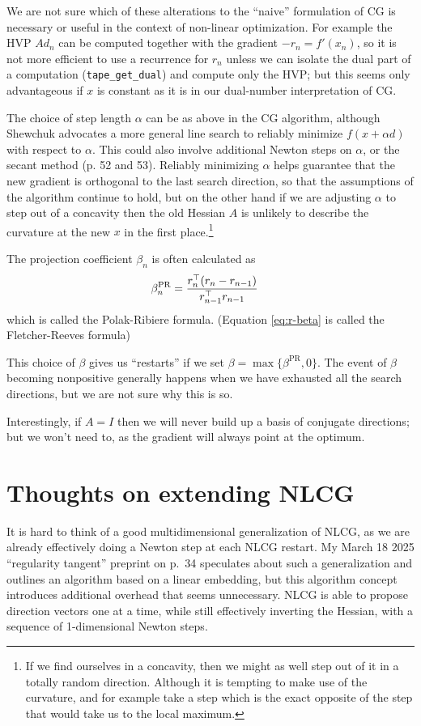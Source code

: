 \documentclass[11pt]{article}
\newcommand{\T}{\top}
\renewcommand{\(}{\left(}
\renewcommand{\)}{\right)}
\newcommand{\betapr}{\beta^{\mathrm{PR}}}
\begin{document}
We are not sure which of these alterations to the ``naive''
formulation of CG is necessary or useful in the context of non-linear
optimization. For example the HVP $A d_n$ can be computed together
with the gradient $-r_n=f'(x_n)$, so it is not more efficient to use a
recurrence for $r_n$ unless we can isolate the dual part of a
computation (\verb|tape_get_dual|) and compute only the HVP; but this
seems only advantageous if $x$ is constant as it is in our dual-number
interpretation of CG.

The choice of step length $\alpha$ can be as above in the CG
algorithm, although Shewchuk advocates a more general line search to
reliably minimize $f(x+\alpha d)$ with respect to $\alpha$. This could
also involve additional Newton steps on $\alpha$, or the secant method
(p. 52 and 53). Reliably minimizing $\alpha$ helps guarantee that the
new gradient is orthogonal to the last search direction, so that the
assumptions of the algorithm continue to hold, but on the other hand
if we are adjusting $\alpha$ to step out of a concavity then the old
Hessian $A$ is unlikely to describe the curvature at the new $x$ in
the first place.\footnote{If we find ourselves in a concavity, then
we might as well step out of it in a totally random direction.
Although it is tempting to make use of the curvature, and for example
take a step which is the exact opposite of the step that would take us
to the local maximum.}

The projection coefficient $\beta_n$ is often calculated as
\begin{align}
\betapr_n &= {r_n^\T (r_n-r_{n-1}) \over r_{n-1}^\T r_{n-1}} \label{eq:betapr}
\end{align}
which is called the Polak-Ribiere formula. (Equation \ref{eq:r-beta}
is called the Fletcher-Reeves formula)

This choice of $\beta$ gives us ``restarts'' if we set
$\beta=\max\{\betapr,0\}$. The event of $\beta$ becoming nonpositive
generally happens when we have exhausted all the search directions,
but we are not sure why this is so.

Interestingly, if $A=I$ then we will never build up a basis of
conjugate directions; but we won't need to, as the gradient will
always point at the optimum.

\section{Thoughts on extending NLCG}

It is hard to think of a good multidimensional generalization of NLCG,
as we are already effectively doing a Newton step at each NLCG
restart. My March 18 2025 ``regularity tangent'' preprint on p.~34
speculates about such a generalization and outlines an algorithm based
on a linear embedding, but this algorithm concept introduces
additional overhead that seems unnecessary. NLCG is able to propose
direction vectors one at a time, while still effectively inverting the
Hessian, with a sequence of 1-dimensional Newton steps.
\end{document}
